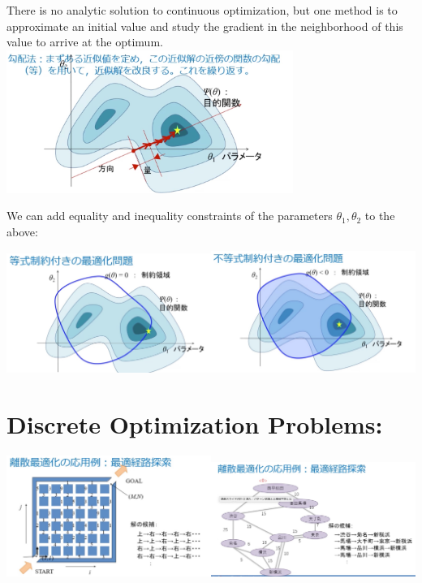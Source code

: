 \documentclass[
]{article}
\begin{document}
There is no analytic solution to continuous optimization, but one method
is to approximate an initial value and study the gradient in the
neighborhood of this value to arrive at the optimum.\\
\includegraphics[width=0.7\textwidth,height=\textheight]{6.jpg}

We can add equality and inequality constraints of the parameters
\(\theta_1, \theta_2\) to the above:

\includegraphics[width=0.5\textwidth,height=\textheight]{7.jpg}\includegraphics[width=0.5\textwidth,height=\textheight]{8.jpg}

\hypertarget{discrete-optimization-problems}{%
\section{Discrete Optimization
Problems:}\label{discrete-optimization-problems}}

\includegraphics[width=0.5\textwidth,height=\textheight]{9.jpg}\includegraphics[width=0.5\textwidth,height=\textheight]{10.jpg}
\end{document}
